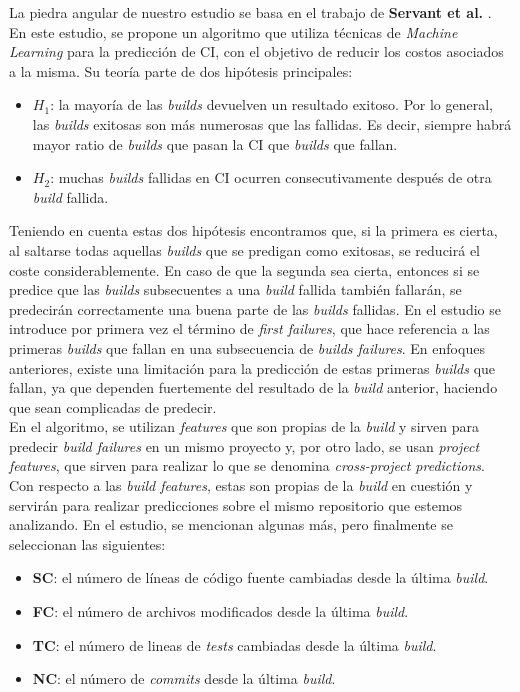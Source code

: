 La piedra angular de nuestro estudio se basa en el trabajo de \textbf{Servant et al.} \cite{2}. En
este estudio, se propone un algoritmo que utiliza técnicas de \textit{Machine Learning}
para la predicción de CI, con el objetivo de reducir los costos asociados a la misma.
Su teoría parte de dos hipótesis principales:

\begin{itemize}
      \item \textit{$H_1$}: la mayoría de las \textit{builds} devuelven un resultado exitoso. Por
      lo general, las \textit{builds} exitosas son más numerosas que las fallidas. Es decir,
      siempre habrá mayor ratio de \textit{builds} que pasan la CI que \textit{builds}
      que fallan.
      \item \textit{$H_2$}: muchas \textit{builds} fallidas en CI ocurren
      consecutivamente después de otra \textit{build} fallida.
\end{itemize}

Teniendo en cuenta estas dos hipótesis encontramos que, si la primera es cierta, al saltarse todas
aquellas \textit{builds} que se predigan como exitosas, se reducirá el coste considerablemente.
En caso de que la segunda sea cierta, entonces si se predice que las \textit{builds} subsecuentes a una
\textit{build} fallida también fallarán, se predecirán correctamente una buena parte de las
\textit{builds} fallidas. En el estudio se introduce por primera vez el término de \textit{first
failures}, que hace referencia a las primeras \textit{builds} que fallan en una subsecuencia de
\textit{builds failures}. En enfoques anteriores, existe una limitación para la predicción
de estas primeras \textit{builds} que fallan, ya que dependen fuertemente del resultado de la
\textit{build} anterior, haciendo que sean complicadas de predecir.\\

En el algoritmo, se utilizan \textit{features} que son propias de la \textit{build} y
sirven para predecir \textit{build failures} en un mismo proyecto y, por otro lado, se usan
\textit{project features}, que sirven para realizar lo que se denomina \textit{cross-project
predictions}. Con respecto a las \textit{build features}, estas son propias de la \textit{build}
en cuestión y servirán para realizar predicciones sobre el mismo repositorio que estemos
analizando. En el estudio, se mencionan algunas más, pero finalmente se seleccionan las
siguientes:

\begin{itemize}
      \item \textbf{SC}: el número de líneas de código fuente cambiadas desde la
      última \textit{build}.
      \item \textbf{FC}: el número de archivos modificados desde la última
      \textit{build}.
      \item \textbf{TC}: el número de lineas de \textit{tests} cambiadas desde la
      última \textit{build}.
      \item \textbf{NC}: el número de \textit{commits} desde la última \textit{build}.
\end{itemize}

